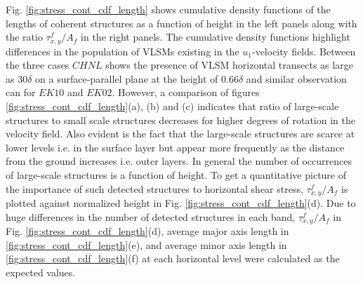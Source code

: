 \documentclass{amsart}
\begin{document}
Fig. \ref{fig:stress_cont_cdf_length}  shows cumulative density functions of the lengths of coherent structures as a function of height in the left panels along with the ratio  $\tau_{x,y}^f/A_f$ in the right  panels. The cumulative density functions highlight differences in the population of VLSMs existing  in the $u_1$-velocity fields. Between the three cases $CHNL$ shows the presence of VLSM horizontal transects  as large as $30\delta$ on a surface-parallel plane at the height of  $0.66\delta$ and similar observation can  for $EK10$ and $EK02$. However,  a comparison of figures \ref{fig:stress_cont_cdf_length}(a), (b) and (c) indicates that ratio of large-scale structures to small scale structures decreases for higher degrees of rotation  in the velocity field. Also evident is the fact that the large-scale structures are scarce at lower levels i.e. in the surface layer but appear more frequently as the distance from the ground increases  i.e. outer layers. In general the number of occurrences of large-scale structures is a function of height.  To get a quantitative picture of the importance of such detected structures to horizontal shear stress, $\tau_{x,y}^f/A_f$ is plotted against normalized height in Fig. \ref{fig:stress_cont_cdf_length}(d).  Due to huge differences in the number of detected structures in each band, $\tau_{x,y}^f/A_f$ in Fig. \ref{fig:stress_cont_cdf_length}(d), average major axis length in \ref{fig:stress_cont_cdf_length}(e), and average minor axis length in \ref{fig:stress_cont_cdf_length}(f) at each horizontal level were calculated as the expected values. 
\end{document}
